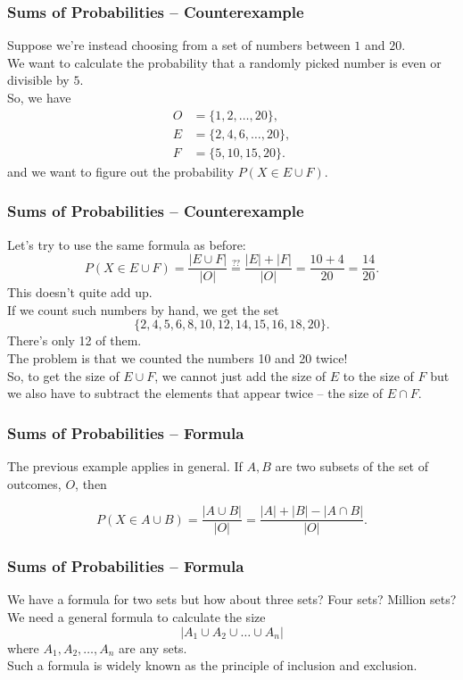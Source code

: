 \documentclass[aspectratio=169,11pt,usenames,dvipsnames,handout]{beamer}
\begin{document}
\begin{frame}
 \frametitle{Sums of Probabilities -- Counterexample}
 Suppose we're instead choosing from a set of numbers between $1$ and
 $20$.\pause\\
 We want to calculate the probability that a randomly picked number is
 \alert{even or divisible by $5$}.\pause\\
 So, we have
 \begin{align*}
  O &= \{1,2,\ldots,20\},\\
  E &= \{2,4,6,\ldots,20\},\\
  F &= \{5,10,15,20\}.
 \end{align*}\pause
 and we want to figure out the probability $P(X \in E \cup F)$.
\end{frame}

\begin{frame}
 \frametitle{Sums of Probabilities -- Counterexample}
 Let's try to use the same formula as before:
 \[
  P(X \in E \cup F) = \frac{|E \cup F|}{|O|} \overset{??}{=} \frac{|E| +
  |F|}{|O|} = \frac{10 + 4}{20} = \frac{14}{20}.
 \]\pause
 This doesn't quite add up.\pause\\
 If we count such numbers by hand, we get the set
 \[
  \{2,4,5,6,8,10,12,14,15,16,18,20\}.
 \]
 \pause
 There's \alert{only 12 of them}.\pause\\
 The problem is that \alert{we counted the numbers 10 and 20 twice}!\pause\\
 So, to get the size of $E \cup F$, we cannot just add the size of $E$ to the
 size of $F$ but we also have to subtract the elements that appear twice -- the
 size of $E \cap F$.
\end{frame}

\begin{frame}
 \frametitle{Sums of Probabilities -- Formula}
 The previous example applies in general. If $A,B$ are two subsets of the set of
 outcomes, $O$, then\pause
 \begin{tcolorbox}
  \[
   P(X \in A \cup B) = \frac{|A \cup B|}{|O|} = \frac{|A| + |B| - |A \cap
   B|}{|O|}.
  \]
 \end{tcolorbox}
\end{frame}

\begin{frame}
 \frametitle{Sums of Probabilities -- Formula}
 We have a formula for two sets but how about three sets? Four sets? Million
 sets?\pause\\
 We need a \alert{general formula} to calculate the size
 \[
  |A_1 \cup A_2 \cup \ldots \cup A_n|
 \]
 where $A_1,A_2,\ldots,A_n$ are any sets.\pause\\
 Such a formula is widely known as the \alert{principle of inclusion and
 exclusion}.
\end{frame}
\end{document}
